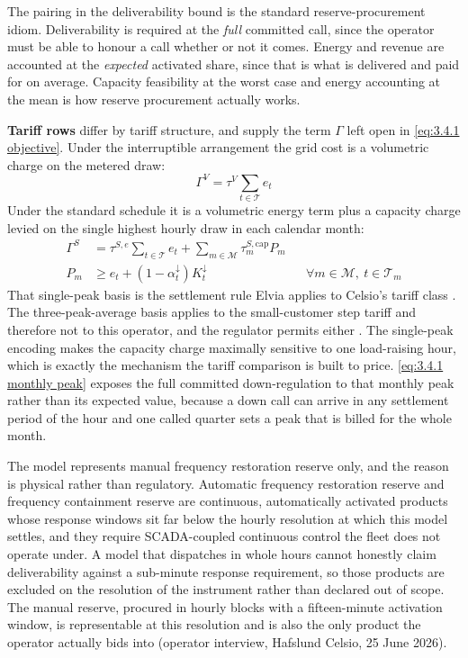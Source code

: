 The pairing in the deliverability bound is the standard reserve-procurement idiom. Deliverability is required at the \emph{full} committed call, since the operator must be able to honour a call whether or not it comes. Energy and revenue are accounted at the \emph{expected} activated share, since that is what is delivered and paid for on average. Capacity feasibility at the worst case and energy accounting at the mean is how reserve procurement actually works.

\textbf{Tariff rows} differ by tariff structure, and supply the term $\Gamma$ left open in \autoref{eq:3.4.1 objective}. Under the interruptible arrangement the grid cost is a volumetric charge on the metered draw:
\begin{equation}
    \Gamma^{V} = \tau^{V} \sum_{t \in \mathcal{T}} e_t \label{eq:3.4.1 tariff V}
\end{equation}
Under the standard schedule it is a volumetric energy term plus a capacity charge levied on the single highest hourly draw in each calendar month:
\begin{align}
    \Gamma^{S} &= \tau^{S,e} \sum_{t \in \mathcal{T}} e_t + \sum_{m \in \mathcal{M}} \tau^{S,\text{cap}}_m P_m \label{eq:3.4.1 tariff S} \\
    P_m &\geq e_t + (1 - \alpha^{\downarrow}_t) K^{\downarrow}_t && \forall m \in \mathcal{M},\ t \in \mathcal{T}_m \label{eq:3.4.1 monthly peak}
\end{align}
That single-peak basis is the settlement rule Elvia applies to Celsio's tariff class \cite{elvia_dagens_2022}. The three-peak-average basis applies to the small-customer step tariff and therefore not to this operator, and the regulator permits either \cite{rme_nettleie_2025}. The single-peak encoding makes the capacity charge maximally sensitive to one load-raising hour, which is exactly the mechanism the tariff comparison is built to price. \autoref{eq:3.4.1 monthly peak} exposes the full committed down-regulation to that monthly peak rather than its expected value, because a down call can arrive in any settlement period of the hour and one called quarter sets a peak that is billed for the whole month.

The model represents manual frequency restoration reserve only, and the reason is physical rather than regulatory. Automatic frequency restoration reserve and frequency containment reserve are continuous, automatically activated products whose response windows sit far below the hourly resolution at which this model settles, and they require SCADA-coupled continuous control the fleet does not operate under. A model that dispatches in whole hours cannot honestly claim deliverability against a sub-minute response requirement, so those products are excluded on the resolution of the instrument rather than declared out of scope. The manual reserve, procured in hourly blocks with a fifteen-minute activation window, is representable at this resolution and is also the only product the operator actually bids into (operator interview, Hafslund Celsio, 25 June 2026).

